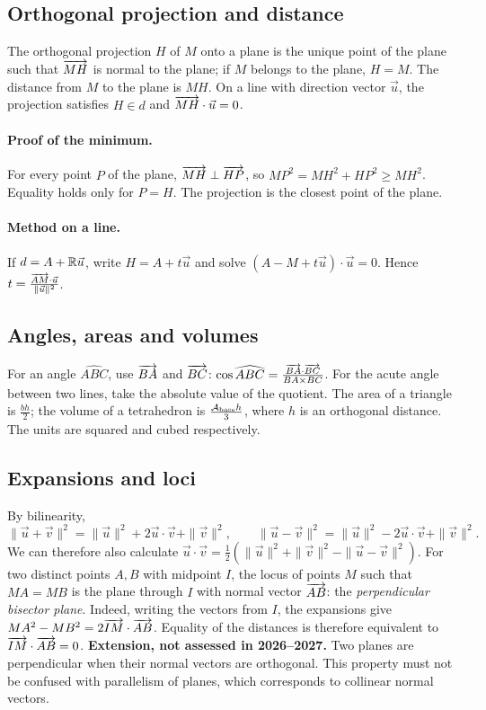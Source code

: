 \subsection{Orthogonal projection and distance}
The orthogonal projection $H$ of $M$ onto a plane is the unique point of the plane such that $\overrightarrow{MH}$ is normal to the plane; if $M$ belongs to the plane, $H=M$. The distance from $M$ to the plane is $MH$. On a line with direction vector $\vec u$, the projection satisfies $H\in d$ and $\overrightarrow{MH}\cdot\vec u=0$.
\paragraph{Proof of the minimum.} For every point $P$ of the plane, $\overrightarrow{MH}\perp\overrightarrow{HP}$, so $MP^2=MH^2+HP^2\ge MH^2$. Equality holds only for $P=H$. The projection is the closest point of the plane.
\paragraph{Method on a line.} If $d=A+\mathbb R\vec u$, write $H=A+t\vec u$ and solve $(A-M+t\vec u)\cdot\vec u=0$. Hence $t=\frac{\overrightarrow{AM}\cdot\vec{u}}{\lVert\vec u\rVert^2}$.
\subsection{Angles, areas and volumes}
For an angle $\widehat{ABC}$, use $\overrightarrow{BA}$ and $\overrightarrow{BC}$: $\cos \widehat{ABC}=\frac{\overrightarrow{BA}\cdot\overrightarrow{BC}}{BA\times BC}$. For the acute angle between two lines, take the absolute value of the quotient.
The area of a triangle is $\frac{bh}{2}$; the volume of a tetrahedron is $\frac{\mathcal{A}_{\rm base}h}{3}$, where $h$ is an orthogonal distance. The units are squared and cubed respectively.
\subsection{Expansions and loci}
By bilinearity,
\[\|\vec u+\vec v\|^2=\|\vec u\|^2+2\vec u\cdot\vec v+\|\vec v\|^2,\qquad
\|\vec u-\vec v\|^2=\|\vec u\|^2-2\vec u\cdot\vec v+\|\vec v\|^2.\]
We can therefore also calculate $\vec u\cdot\vec v=\frac12(\|\vec u\|^2+\|\vec v\|^2-\|\vec u-\vec v\|^2)$.
For two distinct points $A,B$ with midpoint $I$, the locus of points $M$ such that $MA=MB$ is the plane through $I$ with normal vector $\overrightarrow{AB}$: the \emph{perpendicular bisector plane}. Indeed, writing the vectors from $I$, the expansions give $MA^2-MB^2=2\overrightarrow{IM}\cdot\overrightarrow{AB}$. Equality of the distances is therefore equivalent to $\overrightarrow{IM}\cdot\overrightarrow{AB}=0$.
\textbf{Extension, not assessed in 2026--2027.} Two planes are perpendicular when their normal vectors are orthogonal. This property must not be confused with parallelism of planes, which corresponds to collinear normal vectors.



